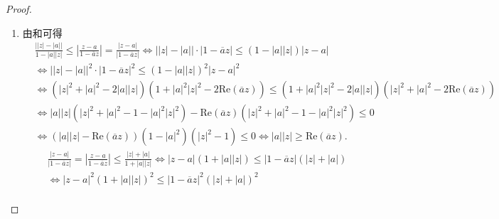 \documentclass[../../main.tex]{subfiles}%
\begin{document}
\begin{proof}
\begin{enumerate}[(1)]
\item 由和可得
\begin{align*}
&\frac{\left| \left| z \right|-\left| a \right| \right|}{1-\left| a \right|\left| z \right|}\leqslant \left| \frac{z-a}{1-\overline{a}z} \right|
=\frac{\left| z-a \right|}{\left| 1-\overline{a}z \right|}\Longleftrightarrow \left| \left| z \right|-\left| a \right| \right|\cdot \left| 1-\overline{a}z \right|\leqslant \left( 1-\left| a \right|\left| z \right| \right) \left| z-a \right|\\
&\Longleftrightarrow \left| \left| z \right|-\left| a \right| \right|^2\cdot \left| 1-\overline{a}z \right|^2\leqslant \left( 1-\left| a \right|\left| z \right| \right) ^2\left| z-a \right|^2\\
&\Longleftrightarrow \left( \left| z \right|^2+\left| a \right|^2-2\left| a \right|\left| z \right| \right) \left( 1+\left| a \right|^2\left| z \right|^2-2\mathrm{Re}\left( \overline{a}z \right) \right) \leqslant \left( 1+\left| a \right|^2\left| z \right|^2-2\left| a \right|\left| z \right| \right) \left( \left| z \right|^2+\left| a \right|^2-2\mathrm{Re}\left( \overline{a}z \right) \right) \\
&\Longleftrightarrow \left| a \right|\left| z \right|\left( \left| z \right|^2+\left| a \right|^2-1-\left| a \right|^2\left| z \right|^2 \right) -\mathrm{Re}\left( \overline{a}z \right) \left( \left| z \right|^2+\left| a \right|^2-1-\left| a \right|^2\left| z \right|^2 \right) \leqslant 0\\
&\Longleftrightarrow \left( \left| a \right|\left| z \right|-\mathrm{Re}\left( \overline{a}z \right) \right) \left( 1-\left| a \right|^2 \right) \left( \left| z \right|^2-1 \right) \leqslant 0\Longleftrightarrow \left| a \right|\left| z \right|\geqslant \mathrm{Re}\left( \overline{a}z \right) .
\end{align*}
\begin{align*}
&\frac{\left| z-a \right|}{\left| 1-\overline{a}z \right|}
=\left| \frac{z-a}{1-\overline{a}z} \right|\leqslant \frac{\left| z \right|+\left| a \right|}{1+\left| a \right|\left| z \right|}
\Longleftrightarrow \left| z-a \right|\left( 1+\left| a \right|\left| z \right| \right) \leqslant \left| 1-\overline{a}z \right|\left( \left| z \right|+\left| a \right| \right) \\
&\Longleftrightarrow \left| z-a \right|^2\left( 1+\left| a \right|\left| z \right| \right) ^2\leqslant \left| 1-\overline{a}z \right|^2\left( \left| z \right|+\left| a \right| \right) ^2\\

\end{align*}
\end{enumerate}
\end{proof}
\end{document}
